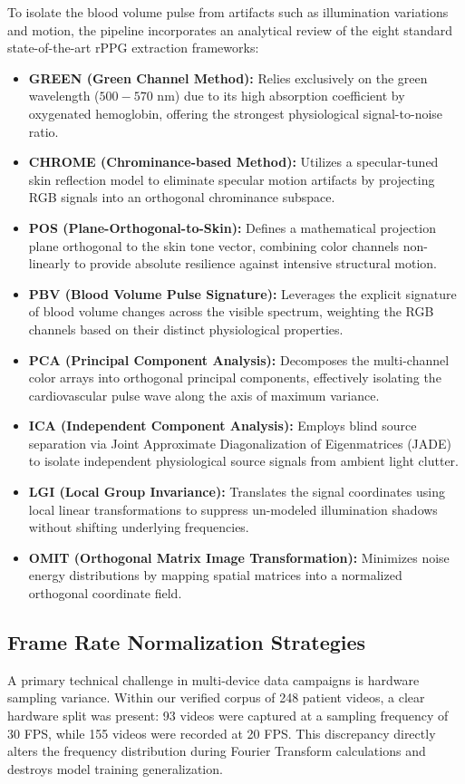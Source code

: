 To isolate the blood volume pulse from artifacts such as illumination variations and motion, the pipeline incorporates an analytical review of the eight standard state-of-the-art rPPG extraction frameworks:
\begin{itemize}
    \item \textbf{GREEN (Green Channel Method):} Relies exclusively on the green wavelength ($500-570\text{ nm}$) due to its high absorption coefficient by oxygenated hemoglobin, offering the strongest physiological signal-to-noise ratio.
    \item \textbf{CHROME (Chrominance-based Method):} Utilizes a specular-tuned skin reflection model to eliminate specular motion artifacts by projecting RGB signals into an orthogonal chrominance subspace.
    \item \textbf{POS (Plane-Orthogonal-to-Skin):} Defines a mathematical projection plane orthogonal to the skin tone vector, combining color channels non-linearly to provide absolute resilience against intensive structural motion.
    \item \textbf{PBV (Blood Volume Pulse Signature):} Leverages the explicit signature of blood volume changes across the visible spectrum, weighting the RGB channels based on their distinct physiological properties.
    \item \textbf{PCA (Principal Component Analysis):} Decomposes the multi-channel color arrays into orthogonal principal components, effectively isolating the cardiovascular pulse wave along the axis of maximum variance.
    \item \textbf{ICA (Independent Component Analysis):} Employs blind source separation via Joint Approximate Diagonalization of Eigenmatrices (JADE) to isolate independent physiological source signals from ambient light clutter.
    \item \textbf{LGI (Local Group Invariance):} Translates the signal coordinates using local linear transformations to suppress un-modeled illumination shadows without shifting underlying frequencies.
    \item \textbf{OMIT (Orthogonal Matrix Image Transformation):} Minimizes noise energy distributions by mapping spatial matrices into a normalized orthogonal coordinate field.
\end{itemize}

\subsection{Frame Rate Normalization Strategies}
A primary technical challenge in multi-device data campaigns is hardware sampling variance. Within our verified corpus of 248 patient videos, a clear hardware split was present: 93 videos were captured at a sampling frequency of 30 FPS, while 155 videos were recorded at 20 FPS. This discrepancy directly alters the frequency distribution during Fourier Transform calculations and destroys model training generalization. 

